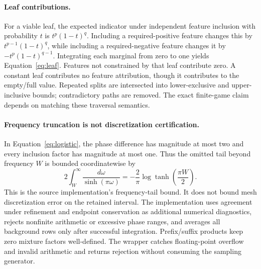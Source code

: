 \documentclass{article}
\begin{document}
\paragraph{Leaf contributions.}
For a viable leaf, the expected indicator under independent feature inclusion with probability $t$ is $t^p(1-t)^q$. Including a required-positive feature changes this by $t^{p-1}(1-t)^q$, while including a required-negative feature changes it by $-t^p(1-t)^{q-1}$. Integrating each marginal from zero to one yields Equation~\ref{eq:leaf}. Features not constrained by that leaf contribute zero. A constant leaf contributes no feature attribution, though it contributes to the empty/full value. Repeated splits are intersected into lower-exclusive and upper-inclusive bounds; contradictory paths are removed. The exact finite-game claim depends on matching these traversal semantics.

\paragraph{Frequency truncation is not discretization certification.}
In Equation~\ref{eq:logistic}, the phase difference has magnitude at most two and every inclusion factor has magnitude at most one. Thus the omitted tail beyond frequency $W$ is bounded coordinatewise by
\begin{equation}
 2\int_W^\infty\frac{d\omega}{\sinh(\pi\omega)}
 =-\frac{2}{\pi}\log\tanh\!\left(\frac{\pi W}{2}\right).
\end{equation}
This is the source implementation's frequency-tail bound. It does not bound mesh discretization error on the retained interval. The implementation uses agreement under refinement and endpoint conservation as additional numerical diagnostics, rejects nonfinite arithmetic or excessive phase ranges, and averages all background rows only after successful integration. Prefix/suffix products keep zero mixture factors well-defined. The wrapper catches floating-point overflow and invalid arithmetic and returns rejection without consuming the sampling generator.
\end{document}
